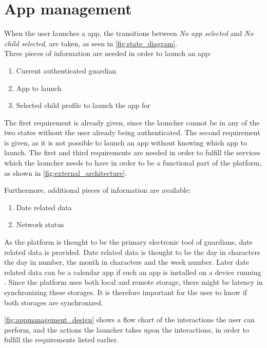 \section{App management}
\label{sec:app_management}
\label{sec:appman_solution}
\label{sec:appman_requirements}

When the user launches a \giraf[] app, the transitions between \emph{No app selected} and \emph{No child selected}, are taken, as seen in \autoref{fig:state_diagram}.\\

\noindent Three pieces of information are needed in order to launch an app:

\begin{enumerate}
	\item Current authenticated guardian
	\item App to launch
	\item Selected child profile to launch the app for
\end{enumerate}

The first requirement is already given, since the launcher cannot be in any of the two states without the user already being authenticated.
The second requirement is given, as it is not possible to launch an app without knowing which app to launch.
The first and third requirements are needed in order to fulfill the services which the launcher needs to have in order to be a functional part of the \giraf[] platform, as shown in \autoref{fig:external_architecture}.

Furthermore, additional pieces of information are available:

\begin{enumerate}
	\item Date related data
	\item Network status 
\end{enumerate}

As the \giraf[] platform is thought to be the primary electronic tool of guardians, date related data is provided. Date related data is thought to be the day in characters the day in number, the month in characters and the week number. Later date related data can be a calendar app if such an app is installed on a device running \giraf[].
Since the \giraf[] platform uses both local and remote storage, there might be latency in synchronizing these storages.
It is therefore important for the user to know if both storages are synchronized.

\autoref{fig:appmanagement_design} shows a flow chart of the interactions the user can perform, and the actions the launcher takes upon the interactions, in order to fulfill the requirements listed earlier.


